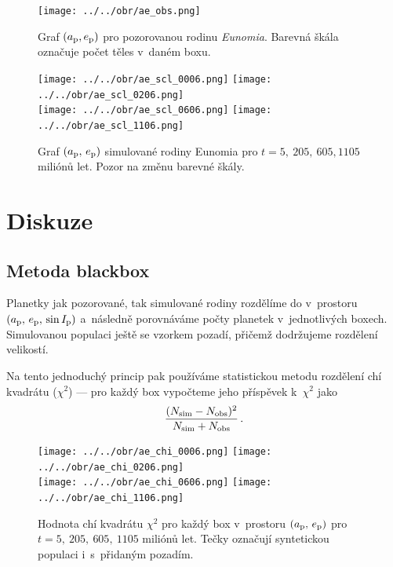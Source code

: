 \documentclass[a4paper, 12pt]{article}
\begin{document}
\begin{figure}
	\centering
	\texttt{[image: ../../obr/ae\_obs.png]}
	\caption{Graf $(a_{\rm p}, e_{\rm p})$ pro pozorovanou rodinu \textit{Eunomia}. Barevná škála označuje počet těles v~daném boxu.}
	\centering
	\texttt{[image: ../../obr/ae\_scl\_0006.png]}
	\texttt{[image: ../../obr/ae\_scl\_0206.png]}\\
	\texttt{[image: ../../obr/ae\_scl\_0606.png]}
	\texttt{[image: ../../obr/ae\_scl\_1106.png]}
	\caption{Graf $(a_{\rm p},\,e_{\rm p})$ simulované rodiny Eunomia pro $t=5,\ 205,\ 605, 1105$ miliónů let. Pozor na změnu barevné škály.} 

	\label{fig:ae_chi2}
\end{figure}
\clearpage

\section{Diskuze} 
\subsection{Metoda blackbox}

Planetky jak pozorované, tak simulované rodiny rozdělíme do  v~prostoru $(a_{\rm p},\,e_{\rm p},\,\sin I_{\rm p})$ a~následně porovnáváme počty planetek v~jednotlivých boxech. Simulovanou populaci ještě  se vzorkem pozadí, přičemž dodržujeme rozdělení velikostí. 

Na tento jednoduchý princip pak používáme statistickou metodu rozdělení chí kvadrátu ($\chi^2$) --- pro každý box vypočteme jeho příspěvek k~$\chi^2$ jako
\begin{align*}
	\frac{(N_{\rm sim}-N_{\rm obs})^2}{N_{\rm sim}+N_{\rm obs}}\,.
\end{align*}

	\begin{figure}
	\centering
	\texttt{[image: ../../obr/ae\_chi\_0006.png]}
	\texttt{[image: ../../obr/ae\_chi\_0206.png]}\\
	\texttt{[image: ../../obr/ae\_chi\_0606.png]}
	\texttt{[image: ../../obr/ae\_chi\_1106.png]}
	\caption{Hodnota chí kvadrátu $\chi^2$ pro každý box v~prostoru $(a_{\rm p},\,e_{\rm p})$ pro $t=5,\ 205,\ 605,\ 1105$ miliónů let. Tečky označují syntetickou populaci i~s~přidaným pozadím.} 
	\label{fig:ae_chi2}
	\end{figure}
\end{document}
